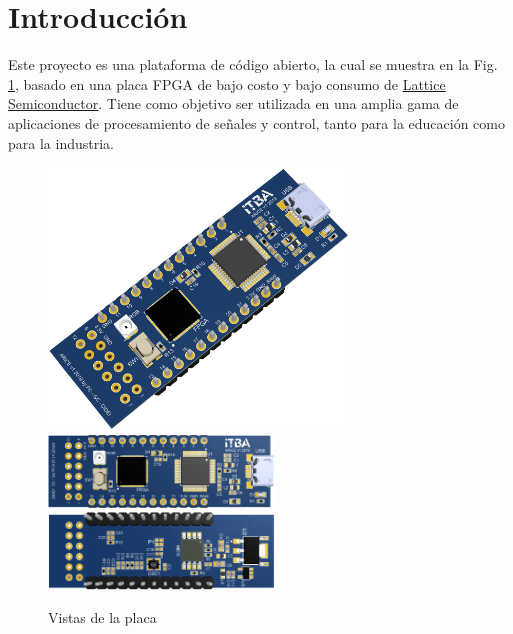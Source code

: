 \documentclass[11pt, a4paper, oneside]{article}
\begin{document}
\tableofcontents
\newpage

\section{Introducción}
Este proyecto es una plataforma de código abierto, la cual se muestra en la Fig. \ref{fig1}, basado en una placa FPGA de bajo costo y bajo consumo de \href{http://www.latticesemi.com}{Lattice Semiconductor}. Tiene como objetivo ser utilizada en una amplia gama de aplicaciones de procesamiento de señales y control, tanto para la educación como para la industria.
%
\begin{figure}[h!]
	\centering
	\includegraphics[width=8cm]{figs/fig1a.png}\\
	\includegraphics[width=6cm]{figs/fig1b.png}%
	\includegraphics[width=6cm]{figs/fig1c.png}
	\caption{Vistas de la placa}
	\label{fig1}
\end{figure}

\end{document}

